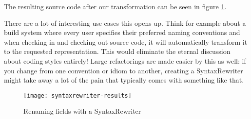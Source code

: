 \begin{minipage}{\linewidth}
\noindent The resulting source code after our transformation can be seen in figure \ref{syntaxrewriter-results}.

There are a lot of interesting use cases this opens up. Think for example about a build system where every user specifies their preferred naming conventions and when checking in and checking out source code, it will automatically transform it to the requested representation. This would eliminate the eternal discussion about coding styles entirely! Large refactorings are made easier by this as well: if you change from one convention or idiom to another, creating a SyntaxRewriter might take away a lot of the pain that typically comes with something like that.

\begin{figure}[H]
\centering
\texttt{[image: syntaxrewriter-results]}
\caption[Renaming fields with a SyntaxRewriter]{Renaming fields with a SyntaxRewriter}
\label{syntaxrewriter-results}
\end{figure}
\end{minipage}